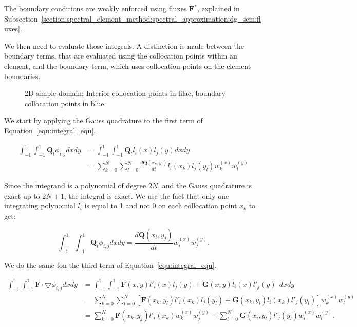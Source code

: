 The boundary conditions are weakly enforced using fluxes $\mathbf{F}^*$, explained in
Subsection~\ref{section:spectral_element_method:spectral_approximation:dg_sem:fluxes}. 

We then need to evaluate those integrals. A distinction is made between the boundary terms, that are
evaluated using the collocation points within an element, and the boundary term, which uses
collocation points on the element boundaries.

\begin{figure}[H]
	\centering
	
	\caption{2D simple domain: Interior collocation points in lilac, boundary collocation points in blue.}
	\label{fig:domain_nodes}
\end{figure}

We start by applying the Gauss quadrature to the first term of Equation~\ref{equ:integral_equ}.

\begin{equation}
	\begin{split}
        \int_{-1}^{1}\int_{-1}^{1} \mathbf{Q}_t \phi_{i, j} dx dy 
        &= \int_{-1}^{1}\int_{-1}^{1}\mathbf{Q}_t l_i(x) l_j(y) dx dy \\
        &= \sum_{k = 0}^{N} \sum_{l = 0}^{N}\frac{d\mathbf{Q} \left( x_k, y_l \right)}{dt} l_i(x_k) l_j(y_l) w_k^{(x)} w_l^{(y)}
	\end{split}
\end{equation}

Since the integrand is a polynomial of degree $2 N$, and the Gauss quadrature is exact up to $2 N +
1$, the integral is exact. We use the fact that only one integrating polynomial $l_i$ is equal to 1
and not 0 on each collocation point $x_k$ to get:

\begin{equation} \label{equ:integral_1}
    \int_{-1}^{1}\int_{-1}^{1} \mathbf{Q}_t \phi_{i, j} dx dy 
    = \frac{d\mathbf{Q} \left( x_i, y_j \right)}{dt} w_i^{(x)} w_j^{(y)}.
\end{equation}

We do the same fon the third term of Equation~\ref{equ:integral_equ}.

\begin{equation} \label{equ:integral_3}
	\begin{split}
		\int_{-1}^{1}\int_{-1}^{1}\mathbf{F} \cdot \bigtriangledown \phi_{i, j} dx dy 
		&= \int_{-1}^{1}\int_{-1}^{1}\mathbf{F}(x, y) l'_i(x)l_j(y) + \mathbf{G}(x, y) l_i(x) l'_j(y) \:\: dx dy \\ 
		&= \sum_{k = 0}^{N} \sum_{l = 0}^{N}\left [ \mathbf{F}(x_k, y_l)l'_i(x_k)l_j(y_l) + \mathbf{G}(x_k, y_l) l_i(x_k)l'_j(y_l) \right ]w_k^{(x)} w_l^{(y)} \\
		&= \sum_{k = 0}^{N} \mathbf{F}(x_k, y_j)l'_i(x_k)w_k^{(x)} w_j^{(y)} + \sum_{l = 0}^{N}\mathbf{G}(x_i, y_l) l'_j(y_l) w_i^{(x)} w_l^{(y)}.
	\end{split}
\end{equation}

